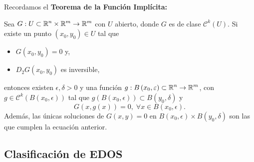 Recordamos el \textbf{Teorema de la Función Implícita:}
\begin{theorem}
Sea $\displaystyle G : U \subset \mathbb{R}^{n} \times \mathbb{R}^{m} \to \mathbb{R}^{m} $ con $\displaystyle U $ abierto, donde $\displaystyle G $ es de clase $\displaystyle \mathcal{C}^{k}\left(U\right) $. Si existe un punto $\displaystyle \left(x_{0}, y_{0}\right) \in U $ tal que 
\begin{itemize}
\item $\displaystyle G\left(x_{0}, y_{0}\right) = 0 $ y,
\item $\displaystyle D_{2}G\left(x_{0}, y_{0}\right) $ es inversible,
\end{itemize}
entonces existen $\displaystyle \epsilon, \delta  >0 $ y una función $\displaystyle g : B\left(x_{0}, \varepsilon \right) \subset \mathbb{R}^{n} \to \mathbb{R}^{m} $, con $\displaystyle g \in \mathcal{C}^{k}\left(B\left(x_{0}, \epsilon \right)\right) $ tal que $\displaystyle g\left(B\left(x_{0}, \epsilon \right)\right)\subset B\left(y_{0}, \delta \right) $ y
\[G\left(x, g\left(x\right)\right) = 0, \; \forall x \in B\left(x_{0}, \epsilon \right). \]
Además, las únicas soluciones de $\displaystyle G\left(x,y\right) = 0 $ en $\displaystyle B\left(x_{0}, \epsilon \right)\times B\left(y_{0}, \delta \right) $ son las que cumplen la ecuación anterior. 
\end{theorem}

\subsection{Clasificación de EDOS}

